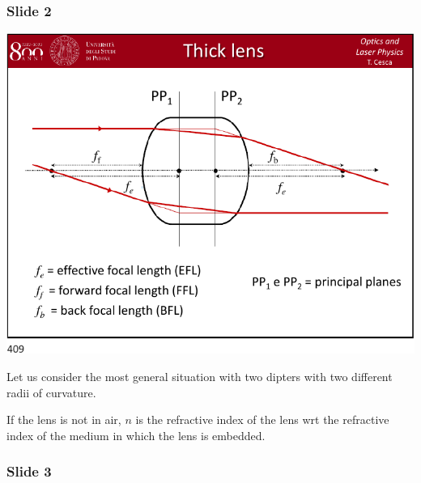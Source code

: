 \documentclass[../main/main.tex]{subfiles}
\begin{document}
\subsubsection*{Slide 2}

\begin{minipage}[]{0.5\linewidth}
\centering
\includegraphics[page=2,width=1\textwidth]{../lessons/pdf_file/20_lecture.pdf}
\end{minipage}
\hspace{0.3cm}\vspace{0.3cm}
\begin{minipage}[c]{0.47\linewidth}

Let us consider the most general situation with two dipters with two different radii of curvature.

If the lens is not in air, \( n \) is the refractive index of the lens wrt the refractive index of the medium in which the lens is embedded.

\end{minipage}

\subsubsection*{Slide 3}
\end{document}
